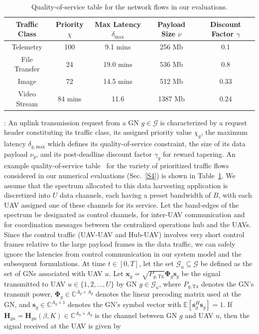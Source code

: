 \documentclass[10pt, twocolumn]{IEEEtran}
\begin{document}
\begin{table} [tb]
	\centering
    \scriptsize
	\begin{tabular}{|c|c|c|c|c|}
		\hline
		\textbf{Traffic Class} & \textbf{Priority} $\chi$ & \textbf{Max Latency} $\delta_{\mathrm{max}}$ & \textbf{Payload Size} $\nu$ & \textbf{Discount Factor} $\gamma$\\
		\hline
		Telemetry & 100 & 9.1 mins & 256 Mb & 0.1\\
		\hline
		File Transfer & 24 & 19.0 mins & 536 Mb & 0.8\\
		\hline
		Image & 72 & 14.5 mins & 512 Mb & 0.33\\
		\hline
		Video Stream & 84 mins & 11.6 & 1387 Mb & 0.24\\
		\hline
	\end{tabular}
    \vspace{-1mm}
	\caption{Quality-of-service table for the network flows in our evaluations.}
    \vspace{-1mm}
	\label{T1}
\end{table}
: An uplink transmission request from a GN $g{\in}\mathcal{G}$ is characterized by a request header constituting its traffic class, its assigned priority value $\chi_{g}$, the maximum latency $\delta_{g,\mathrm{max}}$ which defines its quality-of-service constraint, the size of its data payload $\nu_{g}$, and its post-deadline discount factor $\gamma_{g}$ for reward tapering. An example quality-of-service table~\cite{DARPA:SC2} for the variety of prioritized traffic flows considered in our numerical evaluations (Sec.~\ref{S4}) is shown in Table~\ref{T1}. We assume that the spectrum allocated to this data harvesting application is discretized into $U$ data channels, each having a preset bandwidth of $B$, with each UAV assigned one of these channels for its service. Let the band-edges of the spectrum be designated as control channels, for inter-UAV communication and for coordination messages between the centralized operations hub and the UAVs. Since the control traffic (UAV-UAV and Hub-UAV) involves very short control frames relative to the large payload frames in the data traffic, we can safely ignore the latencies from control communication in our system model and the subsequent formulations. At time $t{\in}[0,T]$, let the set $\mathcal{G}_{u}{\subseteq}\mathcal{G}$ be defined as the set of GNs associated with UAV $u$. Let $\mathbf{x}_{g}{=}\sqrt{P_{g,\mathrm{Tx}}}\boldsymbol{\Phi}_{g}\mathbf{s}_{g}$ be the signal transmitted to UAV $u{\in}\{1,2,{\dots},U\}$ by GN $g{\in}\mathcal{G}_{u}$, where $P_{g,\mathrm{Tx}}$ denotes the GN's transmit power, $\boldsymbol{\Phi}_{g}{\in}\mathbb{C}^{A_{g}{\times}A_{g}}$ denotes the linear precoding matrix used at the GN, and $\mathbf{s}_{g}{\in}\mathbb{C}^{A_{g}{\times}1}$ denotes the GN's symbol vector with $\mathbb{E}\left[\mathbf{s}_{g}^{H}\mathbf{s}_{g}\right]{=}1$. If $\mathbf{H}_{gu}{=}\mathbf{H}_{gu}(\beta,K){\in}\mathbb{C}^{A_{u}{\times}A_{g}}$ is the channel between GN $g$ and UAV $u$, then the signal received at the UAV is given by
\end{document}
